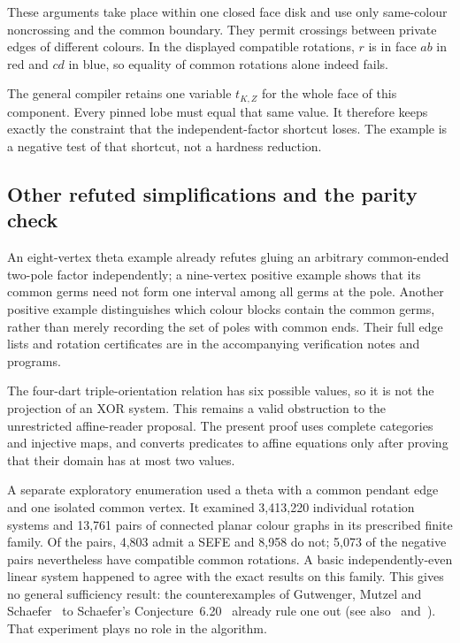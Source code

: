 These arguments take place within one closed face disk and use only
same-colour noncrossing and the common boundary. They permit crossings
between private edges of different colours. In the displayed compatible
rotations, $r$ is in face $ab$ in red and $cd$ in blue, so equality of
common rotations alone indeed fails.

The general compiler retains one variable $t_{K,Z}$ for the whole face of
this component. Every pinned lobe must equal that same value. It therefore
keeps exactly the constraint that the independent-factor shortcut loses.
The example is a negative test of that shortcut, not a hardness reduction.

\subsection{Other refuted simplifications and the parity check}

An eight-vertex theta example already refutes gluing an arbitrary
common-ended two-pole factor independently; a nine-vertex positive example
shows that its common germs need not form one interval among all germs at
the pole. Another positive example distinguishes which colour blocks
contain the common germs, rather than merely recording the set of poles
with common ends. Their full edge lists and rotation certificates are in
the accompanying verification notes and programs.

The four-dart triple-orientation relation has six possible values, so it
is not the projection of an XOR system. This remains a valid obstruction
to the unrestricted affine-reader proposal. The present proof uses complete
categories and injective maps, and converts predicates to affine equations
only after proving that their domain has at most two values.

A separate exploratory enumeration used a theta with a common pendant edge
and one isolated common vertex. It examined 3,413,220 individual rotation
systems and 13,761 pairs of connected planar colour graphs in its prescribed
finite family. Of the pairs, 4,803 admit a SEFE and 8,958 do not; 5,073 of
the negative pairs nevertheless have compatible common rotations. A basic
independently-even linear system happened to agree with the exact results
on this family. This gives no general sufficiency result: the
counterexamples of Gutwenger, Mutzel and Schaefer~\cite{gms2014} to
Schaefer's Conjecture~6.20~\cite{schaefer} already rule one out (see
also~\cite[p.~6]{fkmp2015} and~\cite[p.~137]{fps2017}). That experiment
plays no role in the algorithm.

